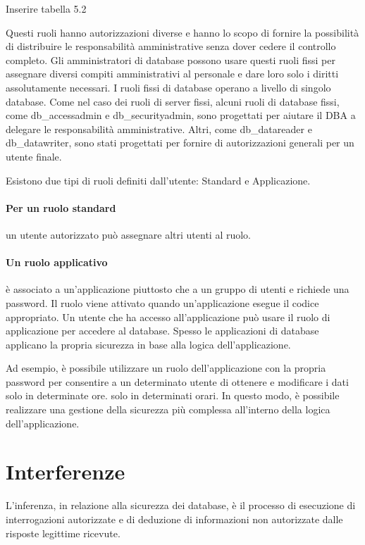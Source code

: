 Inserire tabella 5.2 

Questi ruoli hanno autorizzazioni diverse e hanno lo scopo di fornire la possibilità di distribuire le responsabilità amministrative senza dover cedere il controllo completo. Gli amministratori di database possono usare questi ruoli fissi per assegnare diversi compiti amministrativi al personale e dare loro solo i diritti assolutamente necessari.
I ruoli fissi di database operano a livello di singolo database. Come nel caso dei ruoli di server fissi, alcuni ruoli di database fissi, come db\_accessadmin e db\_securityadmin, sono progettati per aiutare il DBA a delegare le responsabilità amministrative. Altri, come db\_datareader e db\_datawriter, sono stati progettati per fornire di autorizzazioni generali per un utente finale.

\singlespacing

Esistono due tipi di ruoli definiti dall'utente: Standard e Applicazione. 

\singlespacing

\paragraph{Per un ruolo standard} un utente autorizzato può assegnare altri utenti al ruolo.
\paragraph{Un ruolo applicativo} è associato a un'applicazione piuttosto che a un gruppo di utenti e richiede una password. Il ruolo viene attivato quando un'applicazione esegue il codice appropriato. Un utente che ha accesso all'applicazione può usare il ruolo di applicazione per accedere al database. Spesso le applicazioni di database applicano la propria sicurezza in base alla logica dell'applicazione. 

\singlespacing

Ad esempio, è possibile utilizzare un ruolo dell'applicazione con la propria password per consentire a un determinato utente di ottenere e modificare i dati solo in determinate ore. solo in determinati orari. In questo modo, è possibile realizzare una gestione della sicurezza più complessa all'interno della logica dell'applicazione.
\section{Interferenze}
L'inferenza, in relazione alla sicurezza dei database, è il processo di esecuzione di interrogazioni autorizzate e di deduzione di informazioni non autorizzate dalle risposte legittime ricevute.

